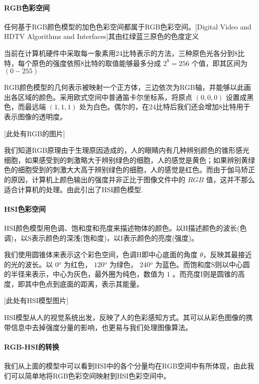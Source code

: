 \paragraph{RGB色彩空间}
任何基于RGB颜色模型的加色色彩空间都属于RGB色彩空间。[Digital Video and HDTV Algorithms and Interfaces]其由红绿蓝三原色的色度定义%

当前在计算机硬件中采取每一象素用24比特表示的方法，三种原色光各分到8比特，每个原色的强度依照8比特的取值能够最多分成 $ 2^8 = 256 $ 个值，即其区间为 $ (0-255) $ 

RGB颜色模型的几何表示被映射一个正方体，三边依次为RGB轴，并能够以此画出各区域的颜色。采用欧式空间中普通笛卡尔坐标系，将原点 $ (0,0,0) $ 设置成黑色，而最远端 $ (1,1,1) $ 处为白色。偶尔的，在24比特后我们还会增加8比特用于表示图像的透明度。

[此处有RGB的图片]

我们知道RGB原理由于生理原因造成的，人的眼睛内有几种辨别颜色的锥形感光细胞，如果感受到的刺激略大于辨别绿色的细胞，人的感觉是黄色；如果辨别黄绿色的细胞受到的刺激大大高于辨别绿色的细胞，人的感觉是红色。而由于伽马矫正的原因，计算机上颜色输出的强度并非正比于图像文件中的 $ RGB $ 值，这并不那么适合计算机的处理。由此引出了HSI颜色模型.

\paragraph{HSI色彩空间}

HSI颜色模型用色调、饱和度和亮度来描述物体的颜色。以H描述颜色的波长(色调)，以S表示颜色的深浅(饱和度)，以I表示颜色的亮度(强度)。

我们使用圆锥体来表示这个彩色空间，色调H即中心底面的角度 $ \theta $，反映其最接近的光的波长。以 $ 0{}^o $ 为红色， $ 120{}^o $ 为绿色， $ 240{}^o $ 为蓝色。而饱和度S则以中心圆的半径来表示，中心为灰色，最外圈为纯色，数值为 $ 1 $ 。而亮度I则是圆锥的高度，即其中色点到底面的距离，表示其能量。

[此处有HSI模型图片]

HSI模型从人的视觉系统出发，反映了人的色彩感知方式。其可以从彩色图像的携带信息中去掉强度分量的影响，也更易与我们处理图像算法。

\paragraph{RGB-HSI的转换}

我们从上面的模型中可以看到HSI中的各个分量均在RGB空间中有所体现，由此我们可以简单地将RGB色彩空间映射到HSI色彩空间中。


